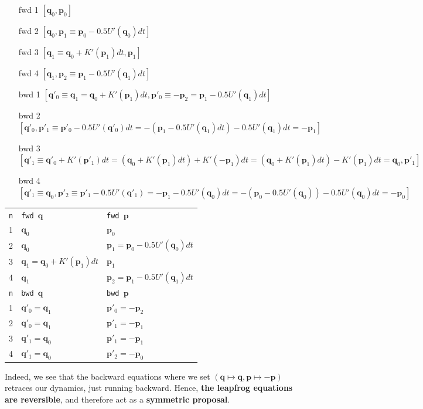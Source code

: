 \documentclass[titlepage]{article}
\newcommand{\p}{\mathbf{p}}
\newcommand{\q}{\mathbf{q}}
\begin{document}
{\footnotesize
\begin{itemize}
    \item[fwd 1] $\left[ \q_0, \p_0 \right]$
    \item[fwd 2] $\left[ \q_0, \p_1 \equiv \p_0 - 0.5U'(\q_0)dt \right]$
    \item[fwd 3] $\left[ \q_1 \equiv \q_0 + K'(\p_1)dt, \p_1 \right]$
    \item[fwd 4] $\left[ \q_1, \p_2 \equiv  \p_1 - 0.5U'(\q_1)dt \right]$
    \item[bwd 1] $\left[ \q'_0 \equiv \q_1 = \q_0 + K'(\p_1)dt, \p'_0 \equiv -\p_2 = \p_1 - 0.5U'(\q_1)dt \right]$
    \item[bwd 2] $\left[ \q'_0, \p'_1 \equiv \p'_0 - 0.5U'(\q'_0)dt = -(\p_1 - 0.5U'(\q_1)dt) - 0.5U'(\q_1)dt = -\p_1 \right]$
    \item[bwd 3] $\left[ \q'_1 \equiv \q'_0 + K'(\p'_1)dt = (\q_0 + K'(\p_1)dt) + K'(-\p_1)dt = (\q_0 + K'(\p_1)dt) -K'(\p_1)dt  = \q_0, \p'_1 \right]$
    \item[bwd 4] $\left[ \q'_1 \equiv \q_0, \p'_2 \equiv \p'_1 - 0.5U'(\q'_1) = -\p_1 - 0.5U'(\q_0)dt = -(\p_0 - 0.5U'(\q_0)) -  0.5U'(\q_0)dt = -\p_0  \right]$
\end{itemize}

\begin{tabular}{lll}
    \texttt{n} & \texttt{fwd $\q$} &  \texttt{fwd $\p$}  \\
    1 & $\q_0$ & $\p_0$  \\
    2 & $\q_0$ & $\p_1 =  \p_0 - 0.5U'(\q_0)dt$ \\
    3 & $\q_1 = \q_0 + K'(\p_1)dt$ & $\p_1$ \\                                                    
    4 & $\q_1$ & $\p_2 =  \p_1 - 0.5U'(\q_1)dt$ \\
    \hline
    \texttt{n} & \texttt{bwd $\q$} &  \texttt{bwd $\p$}  \\
    1 & $\q'_0 = \q_1 $ & $\p'_0 = -\p_2 $ \\
    2 & $\q'_0 = \q_1 $ & $\p'_1 = -\p_1$ \\
    3 & $\q'_1 = \q_0$ & $\p'_1 = -\p_1$\\
    4 & $\q'_1 = \q_0$ & $\p'_2 = -\p_0$ \\
\end{tabular}
}

Indeed, we see that the backward equations where we set $(\q \mapsto \q, \p \mapsto -\p)$
retraces our dynamics, just running backward. Hence, \textbf{the leapfrog equations are reversible},
and therefore act as a \textbf{symmetric proposal}.
\end{document}
